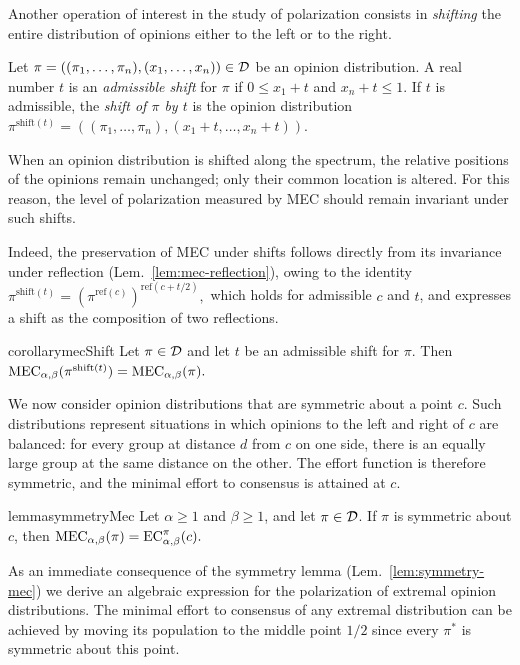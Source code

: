 Another operation of interest in the study of polarization consists in \emph{shifting} the entire distribution of opinions either to the left or to the right.   

\begin{definition}[Shifts]
Let 
\(
\pi=((\pi_1,\ldots,\pi_n),(x_1,\ldots,x_n))\in\mathcal{D}
\)
be an opinion distribution. A real number $t$ is an \emph{admissible shift} for $\pi$ if
\(
0 \le x_1+t \)
and \(
x_n+t \le 1.
\) If $t$ is admissible, the \emph{shift of $\pi$ by $t$} is the opinion distribution  
\(
\pi^{\mathrm{shift}(t)}
=
((\pi_1,\ldots,\pi_n),(x_1+t,\ldots,x_n+t)).
\) 
\end{definition}

When an opinion distribution is shifted along the spectrum, the relative
positions of the opinions remain unchanged; only their common location is
altered. For this reason, the level of polarization measured by MEC should
remain invariant under such shifts. 

Indeed, the preservation of MEC under shifts follows directly from its
invariance under reflection (Lem.~\ref{lem:mec-reflection}), owing to the identity
\(
\pi^{\mathrm{shift}(t)}
=
\left(\pi^{\mathrm{ref}(c)}\right)^{\mathrm{ref}(c+t/2)},
\)
which holds for admissible $c$ and $t$, and expresses a shift as the
composition of two reflections.

\begin{restatable}{corollary}{mecShift}
\label{cor:mec-shift}
Let $\pi\in\mathcal{D}$ and let $t$ be an admissible shift for $\pi$. Then
\(
\MEC[\alpha,\beta](\pi^{\mathrm{shift}(t)})
=
\MEC[\alpha,\beta](\pi).
\)
\end{restatable}

We now consider opinion distributions that are symmetric about a point $c$. 
Such distributions represent situations in which opinions to the left and right of $c$ are balanced: for every group at distance $d$ from $c$ on one side, there is an equally large group at the same distance on the other. 
The effort function is therefore symmetric, and the minimal effort to consensus is attained at $c$.

\begin{restatable}[Symmetry]{lemma}{symmetryMec}
\label{lem:symmetry-mec}
Let $\alpha \ge 1$ and $\beta \ge 1$, and let $\pi\in\mathcal{D}$. If $\pi$ is symmetric about $c$, then
\(
\MEC[\alpha,\beta](\pi)
=
\EC(c).
\)
\end{restatable}

As an immediate consequence of the symmetry lemma (Lem.~\ref{lem:symmetry-mec}) we derive an algebraic expression for the polarization of extremal opinion distributions. The minimal effort to consensus of any extremal distribution can be achieved by moving its population to the middle point $1/2$ since every $\pi^*$ is symmetric about this point.   

